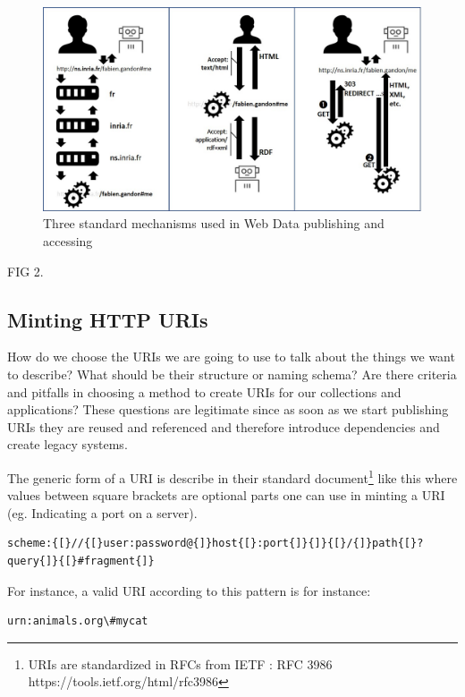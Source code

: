 \begin{figure}
    \centering
        \includegraphics[width=5.0in]{media/ch5/figure-05-02.jpg}
    \caption{Three standard mechanisms used in Web Data publishing and
accessing}
    \label{fig:ch5.2}
\end{figure}

FIG 2. 

\hypertarget{minting-http-uris}{%
\subsection{Minting HTTP URIs}\label{minting-http-uris}}

How do we choose the URIs we are going to use to talk about the things
we want to describe? What should be their structure or naming schema?
Are there criteria and pitfalls in choosing a method to create URIs for
our collections and applications? These questions are legitimate since
as soon as we start publishing URIs they are reused and referenced and
therefore introduce dependencies and create legacy systems.

The generic form of a URI is describe in their standard
document\footnote{URIs are standardized in RFCs from IETF : RFC 3986
  https://tools.ietf.org/html/rfc3986} like this where values between
square brackets are optional parts one can use in minting a URI (eg.
Indicating a port on a server).

\begin{lstlisting}
scheme:{[}//{[}user:password@{]}host{[}:port{]}{]}{[}/{]}path{[}?query{]}{[}#fragment{]}
\end{lstlisting}

For instance, a valid URI according to this pattern is for instance:

\begin{lstlisting}
urn:animals.org\#mycat
\end{lstlisting}


